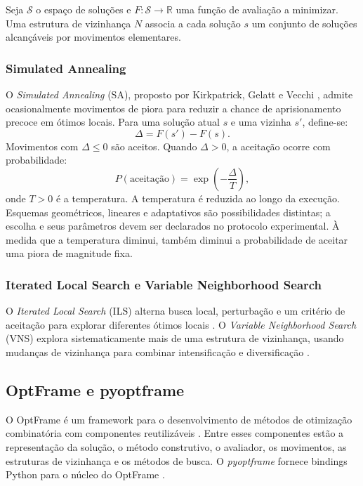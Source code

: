 Seja $\mathcal{S}$ o espaço de soluções e $F:\mathcal{S}\rightarrow\mathbb{R}$ uma função de avaliação a minimizar. Uma estrutura de vizinhança $N$ associa a cada solução $s$ um conjunto de soluções alcançáveis por movimentos elementares.

\subsubsection{Simulated Annealing}

O \textit{Simulated Annealing} (SA), proposto por Kirkpatrick, Gelatt e Vecchi \cite{kirkpatrick1983optimization}, admite ocasionalmente movimentos de piora para reduzir a chance de aprisionamento precoce em ótimos locais. Para uma solução atual $s$ e uma vizinha $s'$, define-se:
\begin{equation}
    \Delta = F(s')-F(s).
\end{equation}
Movimentos com $\Delta\leq 0$ são aceitos. Quando $\Delta>0$, a aceitação ocorre com probabilidade:
\begin{equation}
    P(\text{aceitação})=\exp\left(-\frac{\Delta}{T}\right),
\end{equation}
onde $T>0$ é a temperatura. A temperatura é reduzida ao longo da execução. Esquemas geométricos, lineares e adaptativos são possibilidades distintas; a escolha e seus parâmetros devem ser declarados no protocolo experimental. À medida que a temperatura diminui, também diminui a probabilidade de aceitar uma piora de magnitude fixa.

\subsubsection{Iterated Local Search e Variable Neighborhood Search}

O \textit{Iterated Local Search} (ILS) alterna busca local, perturbação e um critério de aceitação para explorar diferentes ótimos locais \cite{lourenco2003iterated}. O \textit{Variable Neighborhood Search} (VNS) explora sistematicamente mais de uma estrutura de vizinhança, usando mudanças de vizinhança para combinar intensificação e diversificação \cite{hansen2001variable}.

\subsection{OptFrame e pyoptframe}
\label{subsec:optframe_teoria}

O OptFrame é um framework para o desenvolvimento de métodos de otimização combinatória com componentes reutilizáveis \cite{coelho2010optframe,coelho2020microbenchmark}. Entre esses componentes estão a representação da solução, o método construtivo, o avaliador, os movimentos, as estruturas de vizinhança e os métodos de busca. O \textit{pyoptframe} fornece bindings Python para o núcleo do OptFrame \cite{pyoptframe2026}.


